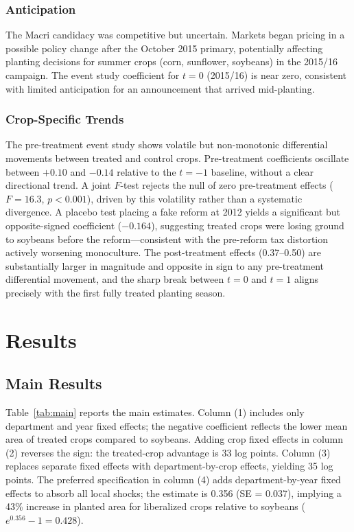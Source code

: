 \documentclass[12pt]{article}
\begin{document}
\subsubsection*{Anticipation} The Macri candidacy was competitive but uncertain. Markets began pricing in a possible policy change after the October 2015 primary, potentially affecting planting decisions for summer crops (corn, sunflower, soybeans) in the 2015/16 campaign. The event study coefficient for $t=0$ (2015/16) is near zero, consistent with limited anticipation for an announcement that arrived mid-planting.

\subsubsection*{Crop-Specific Trends} The pre-treatment event study shows volatile but non-monotonic differential movements between treated and control crops. Pre-treatment coefficients oscillate between $+0.10$ and $-0.14$ relative to the $t = -1$ baseline, without a clear directional trend. A joint $F$-test rejects the null of zero pre-treatment effects ($F = 16.3$, $p < 0.001$), driven by this volatility rather than a systematic divergence. A placebo test placing a fake reform at 2012 yields a significant but opposite-signed coefficient ($-0.164$), suggesting treated crops were losing ground to soybeans before the reform---consistent with the pre-reform tax distortion actively worsening monoculture. The post-treatment effects (0.37--0.50) are substantially larger in magnitude and opposite in sign to any pre-treatment differential movement, and the sharp break between $t = 0$ and $t = 1$ aligns precisely with the first fully treated planting season.


\section{Results}
\label{sec:results}

\subsection{Main Results}



Table~\ref{tab:main} reports the main estimates. Column (1) includes only department and year fixed effects; the negative coefficient reflects the lower mean area of treated crops compared to soybeans. Adding crop fixed effects in column (2) reverses the sign: the treated-crop advantage is 33 log points. Column (3) replaces separate fixed effects with department-by-crop effects, yielding 35 log points. The preferred specification in column (4) adds department-by-year fixed effects to absorb all local shocks; the estimate is 0.356 (SE = 0.037), implying a 43\% increase in planted area for liberalized crops relative to soybeans ($e^{0.356} - 1 = 0.428$).
\end{document}
